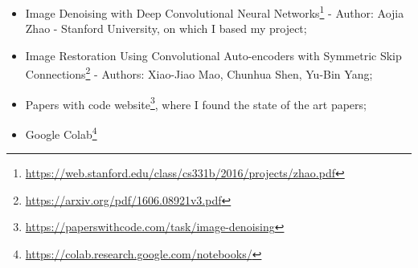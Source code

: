 \documentclass[twocolumn,showpacs,%
  nofootinbib,aps,superscriptaddress,%
  eqsecnum,prd,notitlepage,showkeys,10pt]{revtex4-1}
\begin{document}
\begin{acknowledgments}
    \begin{itemize}
        \item Image Denoising with Deep Convolutional Neural Networks\footnote{\url{https://web.stanford.edu/class/cs331b/2016/projects/zhao.pdf}} - Author: Aojia Zhao - Stanford University, on which I based my project;
        \item Image Restoration Using Convolutional Auto-encoders with Symmetric Skip Connections\footnote{\url{https://arxiv.org/pdf/1606.08921v3.pdf}} - Authors: Xiao-Jiao Mao, Chunhua Shen, Yu-Bin Yang;
        \item Papers with code website\footnote{\url{https://paperswithcode.com/task/image-denoising}}, where I found the state of the art papers;
        \item Google Colab\footnote{\url{https://colab.research.google.com/notebooks/}}
    \end{itemize}
\end{acknowledgments}
\end{document}
